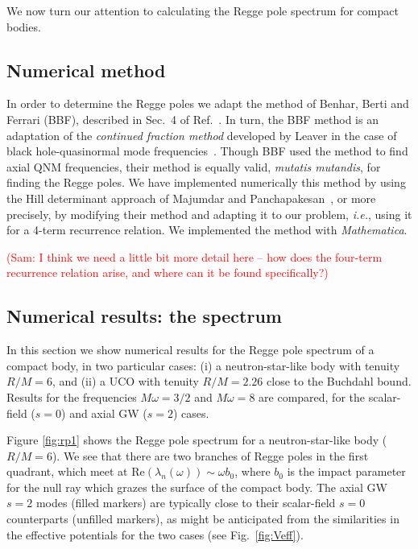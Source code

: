 \documentclass[aps,prd,longbibliography,reprint,twocolumn,amsmath,amssymb,amsfonts,showpacs,superscriptaddress]{revtex4-1}%
\newcommand{\sam}[1]{\textcolor{red}{(Sam: #1)}}
\begin{document}
We now turn our attention to calculating the Regge pole spectrum for compact bodies.


 \subsection{Numerical method}\label{subsec:method}


In order to determine the Regge poles we adapt the method of Benhar, Berti and Ferrari (BBF), described in Sec.~4 of Ref.~\cite{Benhar:1998au}. In turn, the BBF method is an adaptation of the \textit{continued fraction method} developed by Leaver in the case of black hole-quasinormal mode frequencies~\cite{Leaver:1985ax}. Though BBF used the method to find axial QNM frequencies, their method is equally valid, \textit{mutatis mutandis}, for finding the Regge poles. We have implemented numerically this method by using the Hill determinant approach of Majumdar and Panchapakesan~\cite{mp}, or more precisely, by modifying their method and adapting it to our problem, \textit{i.e.}, using it for a 4-term recurrence relation. We implemented the method with  \emph{Mathematica}.

\sam{I think we need a little bit more detail here -- how does the four-term recurrence relation arise, and where can it be found specifically?}


 \subsection{Numerical results: the spectrum}\label{subsec:results1}
In this section we show numerical results for the Regge pole spectrum of a compact body, in two particular cases: (i) a neutron-star-like body with tenuity $R / M = 6$, and (ii) a UCO with tenuity $R / M = 2.26$ close to the Buchdahl bound. Results for the frequencies $M \omega = 3/2$ and $M \omega = 8$ are compared, for the scalar-field ($s=0$) and axial GW ($s=2$) cases.

Figure \ref{fig:rp1} shows the Regge pole spectrum for a neutron-star-like body ($R/M = 6$). We see that there are two branches of Regge poles in the first quadrant, which meet at $\text{Re}( \lambda_n(\omega) ) \sim \omega b_0$, where $b_0$ is the impact parameter for the null ray which grazes the surface of the compact body. The axial GW $s=2$ modes (filled markers) are typically close to their scalar-field $s=0$ counterparts (unfilled markers), as might be anticipated from the similarities in the effective potentials for the two cases (see Fig.~\ref{fig:Veff}).
\end{document}
